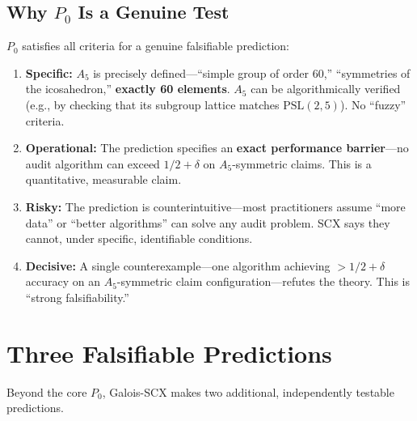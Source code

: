 \documentclass[12pt,a4paper]{article}
\theoremstyle{remark}
\begin{document}
\subsection{Why \(P_0\) Is a Genuine Test}
\(P_0\) satisfies all criteria for a genuine falsifiable prediction:
\begin{enumerate}[label=(\roman*),itemsep=3pt]
    \item \textbf{Specific:} \(A_5\) is precisely defined---``simple group of order 60,'' ``symmetries of the icosahedron,'' \textbf{exactly 60 elements}. \(A_5\) can be algorithmically verified (e.g., by checking that its subgroup lattice matches \(\mathrm{PSL}(2,5)\)). No ``fuzzy'' criteria.
    \item \textbf{Operational:} The prediction specifies an \textbf{exact performance barrier}---no audit algorithm can exceed \(1/2 + \delta\) on \(A_5\)-symmetric claims. This is a quantitative, measurable claim.
    \item \textbf{Risky:} The prediction is counterintuitive---most practitioners assume ``more data'' or ``better algorithms'' can solve any audit problem. SCX says they cannot, under specific, identifiable conditions.
    \item \textbf{Decisive:} A single counterexample---one algorithm achieving \(>1/2 + \delta\) accuracy on an \(A_5\)-symmetric claim configuration---refutes the theory. This is ``strong falsifiability.''
\end{enumerate}
\section{Three Falsifiable Predictions}
Beyond the core \(P_0\), Galois-SCX makes two additional, independently testable predictions.
\end{document}
